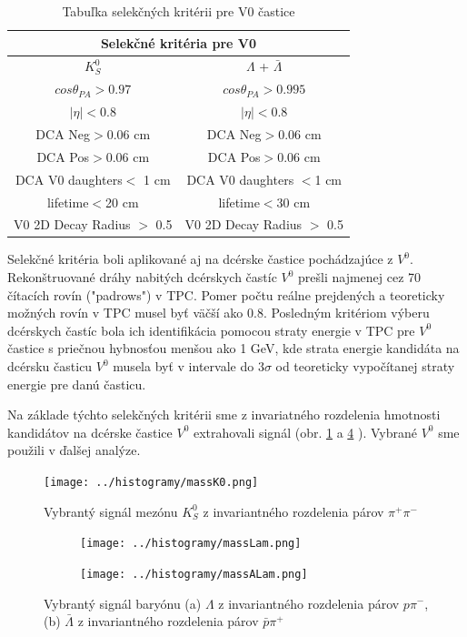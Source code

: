 \documentclass[thesismargins, thesislinespacing]{rnthesis}
\begin{document}
\begin{table}[hbtp!]
	\begin{center}
		\begin{tabular}{|c|c|}
			\hline
			 \multicolumn{2}{|c|}{Selekčné kritéria pre V0}  \\ \hline
			$K^0_S$ & $\Lambda$ + $\bar{\Lambda}$ \\ \hline
			$cos\theta_{PA} >0.97$ & $cos\theta_{PA} >0.995$  \\ \hline
			$|\eta|<0.8$ & $|\eta|<0.8$   \\ \hline
			DCA Neg$>$0.06 cm & DCA Neg$>$0.06 cm \\ \hline
			DCA Pos$>$0.06 cm & DCA Pos$>$0.06 cm \\ \hline
			DCA V0 daughters$<$ 1 cm & DCA V0 daughters $<$1 cm \\ \hline
			lifetime$<$20 cm & lifetime$<$30 cm \\ \hline
			V0 2D Decay Radius $>$ 0.5 & V0 2D Decay Radius $>$ 0.5\\ 
			\hline
		\end{tabular}
		\caption{Tabuľka selekčných kritérii pre V0 častice}
		\label{tabulka}
	\end{center}
\end{table}
\newpage
Selekčné kritéria boli aplikované aj na dcérske častice pochádzajúce z $V^0$. Rekonštruované dráhy nabitých dcérskych častíc $V^0$ prešli najmenej cez 70 čítacích rovín ("padrows") v TPC. Pomer počtu reálne prejdených a teoreticky možných rovín v TPC musel byť väčší ako 0.8. Posledným kritériom výberu dcérskych častíc bola ich identifikácia pomocou straty energie v TPC pre $V^0$ častice s priečnou hybnosťou menšou ako 1 GeV, kde strata energie kandidáta na dcérsku časticu $V^0$ musela byť v intervale do $3\sigma$ od teoreticky vypočítanej straty energie pre danú časticu.

Na základe týchto selekčných kritérii sme z invariatného rozdelenia hmotnosti kandidátov na dcérske častice $V^0$ extrahovali signál (obr. \ref{k0} a \ref{Lambdy} ). Vybrané $V^0$ sme použili v ďalšej analýze. 

\begin{figure}[hbtp!]
	\centering
	\texttt{[image: ../histogramy/massK0.png]}
	\caption{Vybrantý signál mezónu $K^0_S$ z invariantného rozdelenia párov $\pi^+\pi^-$}
	\label{k0}
\end{figure}
\begin{figure}
	\centering
	\begin{subfigure}{0.5\textwidth}
		\centering
		\texttt{[image: ../histogramy/massLam.png]}
		\caption{}
		\label{Lam}
	\end{subfigure}%
	\begin{subfigure}{0.5\textwidth}
		\centering
		\texttt{[image: ../histogramy/massALam.png]}
		\caption{}
		\label{ALam}
	\end{subfigure}
	\caption{Vybrantý signál baryónu (a) $\Lambda$ z invariantného rozdelenia párov $p\pi^-$, (b) $\bar{\Lambda}$ z invariantného rozdelenia párov $\bar{p}\pi^+$}
	\label{Lambdy}
\end{figure}
\end{document}
